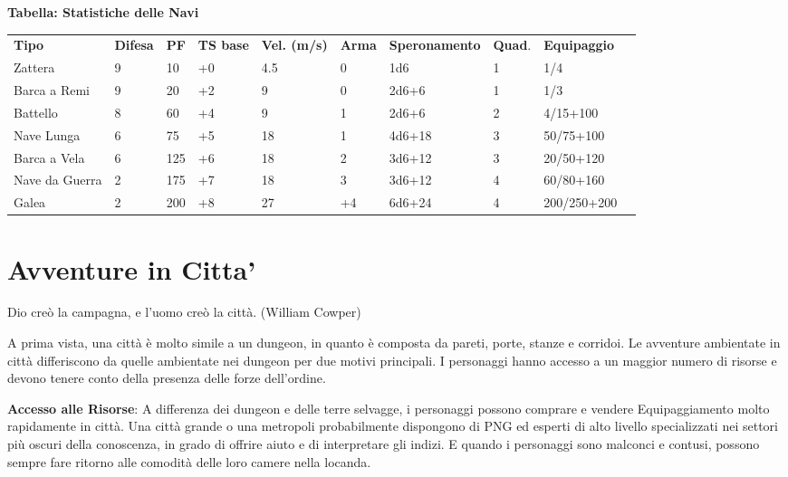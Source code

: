 \documentclass[a4paper,11pt,twoside,openany]{book}
\begin{document}
\bigskip

\textbf{Tabella: Statistiche delle Navi}

\medskip

\begin{tabularx}{0.95\textwidth}{lXlllllXll}
	\toprule
	\textbf{Tipo}  & \textbf{Difesa} & \textbf{PF} & \textbf{TS base} & \textbf{Vel. (m/s)} & \textbf{Arma} & \textbf{Speronamento} & \textbf{Quad}. & \textbf{Equipaggio}\\
	Zattera   & 9     & 10& +0& 4.5  & 0   & 1d6    & 1    & 1/4\\
	Barca a Remi   & 9& 20& +2& 9    & 0   & 2d6+6  & 1    & 1/3\\
	Battello  & 8& 60& +4& 9    & 1   & 2d6+6  & 2    & 4/15+100\\
	Nave Lunga& 6& 75& +5& 18   & 1   & 4d6+18 & 3    & 50/75+100\\
	Barca a Vela   & 6& 125    & +6& 18   & 2   & 3d6+12 & 3    & 20/50+120\\
	Nave da Guerra & 2& 175    & +7& 18   & 3   & 3d6+12 & 4    & 60/80+160\\
	Galea& 2& 200    & +8& 27   & +4  & 6d6+24 & 4    & 200/250+200\\
\end{tabularx}

\pagebreak

\section{Avventure in Citta'}

\label{avventure-in-citta}
\begin{tcolorbox}[enhanced,arc=5pt,boxrule=0.3pt]{Dio creò la campagna, e l'uomo creò la città. (William Cowper)}\end{tcolorbox}\medskip

A prima vista, una città è molto simile a un dungeon, in quanto è composta da pareti, porte, stanze e corridoi. Le avventure ambientate in città differiscono da quelle ambientate nei dungeon per due motivi principali. I personaggi hanno accesso a un maggior numero di risorse e devono tenere conto della presenza delle forze dell'ordine.

\textbf{Accesso alle Risorse}: A differenza dei dungeon e delle terre selvagge, i personaggi possono comprare e vendere Equipaggiamento molto rapidamente in città. Una città grande o una metropoli probabilmente dispongono di PNG ed esperti di alto livello specializzati nei settori più oscuri della conoscenza, in grado di offrire aiuto e di interpretare gli indizi. E quando i personaggi sono malconci e contusi, possono sempre fare ritorno alle comodità delle loro camere nella locanda.
\end{document}
